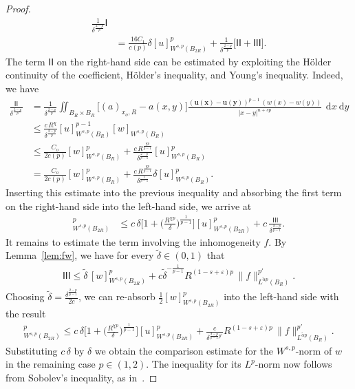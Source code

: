 \documentclass[10pt,letterpaper]{amsart}
\theoremstyle{definition}
\numberwithin{theorem}{section}
\numberwithin{equation}{section}
\newcommand{\1}{\ensuremath{\mathds{1}}}
\newcommand\sfI{{\boldsymbol{\mathsf I}}}
\renewcommand{\epsilon}{\varepsilon}
\renewcommand{\epsilon}{\varepsilon}
\renewcommand{\d}{\:\! \mathrm{d}}
\numberwithin{equation}{section}
\begin{document}
\begin{proof}
\begin{align*}
    \frac{1}{\delta^{\frac{2-p}{p}}}\sfI\\
    &=
    \frac{16C_1}{c(p)}\delta [u]_{W^{s,p}(B_{2R})}^p +
    \frac{1}{\delta^{\frac{2-p}{p}}} 
    \big[\sfI \sfI+\sfI\sfI\sfI\big].
\end{align*}
The term $\sfI\sfI$ on the right-hand side can be estimated by exploiting
the Hölder continuity of the coefficient, Hölder's inequality, and Young's
inequality. Indeed, we have
\begin{align*}
    \frac{\sfI\sfI}{\delta^{\frac{2-p}{p}}}
    &=
    \frac{1}{\delta^{\frac{2-p}{p}}}\iint_{B_R\times B_R}
    \big[(a)_{x_o,R}-a(x,y)\big]
    \frac{\boldsymbol{(u(x)-u(y))}^{p-1}\,(w(x)-w(y))}{|x-y|^{n+sp}}
    \,\d x \d y \\
    &\le
    \frac{c\,R^{\chi}}{\delta^\frac{2-p}p}
    [u]_{W^{s,p}(B_R)}^{p-1}
    [w]_{W^{s,p}(B_R)} \\
    &\le
    \frac{C_o}{2c(p)}[w]_{W^{s,p}(B_R)}^p
    +
    \frac{c\, R^{\frac{\chi p}{p-1}}}{\delta^\frac{2-p}{p-1}}
    [u]_{W^{s,p}(B_R)}^p\\
    &=
    \frac{C_o}{2c(p)}[w]_{W^{s,p}(B_R)}^p
    +
    \frac{c\, R^{\frac{\chi p}{p-1}}}{\delta^\frac{1}{p-1}}\delta
    [u]_{W^{s,p}(B_R)}^p.
\end{align*}
Inserting this estimate into the previous inequality and absorbing the first
term on the right-hand side into the left-hand side, we arrive at
\begin{align*}
     [w]_{W^{s,p}(B_{2R})}^p
     &\le
     c\,\delta \bigg[1
     +
     \Big(\frac{R^{\chi p}}{\delta}\Big)^\frac1{p-1}\bigg]
     [u]_{W^{s,p}(B_{2R})}^p
     +c\, \frac{\sfI\sfI\sfI}{\delta^\frac{2-p}{p-1}}.
\end{align*}
It remains to estimate the term involving the inhomogeneity $f$.
By Lemma~\ref{lem:fw}, we have for every $\tilde\delta\in(0,1)$ that 
\begin{align*}
    \sfI\sfI\sfI
    \le
    \tilde\delta\,[w]_{W^{s,p}(B_{2R})}^p
    +
    c\tilde\delta^{-\frac{1}{p-1}} R^{(1-s+\epsilon)p}\,
    \|f\|_{L^{\tilde\alpha p}(B_R)}^{p'} .
\end{align*}
Choosing $\tilde\delta=\frac{\delta^\frac{2-p}{p-1}}{2c}$, we can re-absorb $\frac12[w]_{W^{s,p}(B_{2R})}^p$ into the left-hand side with the result
\begin{align*}
     [w]_{W^{s,p}(B_{2R})}^p
     \le
     c\,\delta \bigg[1
     +
     \Big(\frac{R^{\chi p}}{\delta}\Big)^\frac1{p-1}\bigg]
     [u]_{W^{s,p}(B_{2R})}^p
     + \frac{c}{\delta^{\frac{2-p}{p-1}p'}} 
     R^{(1-s+\epsilon)p}\,
    \|f\|_{L^{\tilde\alpha p}(B_R)}^{p'}.
\end{align*}
Substituting $c\,\delta$ by $\delta$ we obtain the comparison estimate for the $W^{s,p}$-norm of $w$ in the remaining case $p\in(1,2)$. The inequality for its $L^p$-norm now follows from Sobolev's inequality, as in~\cite[Corollary~3.3]{BDLM}.
\end{proof}
\end{document}
